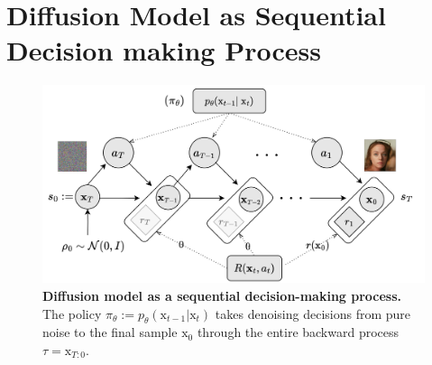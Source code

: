 
\section{Diffusion Model as Sequential Decision making Process}\label{sec:diffusion-model-mdp}

\begin{figure}[ht]
  \centering
  \includegraphics[scale=0.85]{img/results/diffusion-model-MDP.png}
  \vspace{-4pt}  %
    \captionsetup{width=\textwidth} %
    \caption{\textbf{Diffusion model as a sequential decision-making process.} The policy $\pi_{\theta}:=p_{\theta}(\mathrm{x}_{t-1} | \mathrm{x}_{t})$  takes denoising decisions from pure noise to the final sample $\mathrm{x}_0$ through the entire backward process $\tau=\mathrm{x}_{T:0}$.}
  \label{fig:diffusion-model-mdp}
\end{figure}

